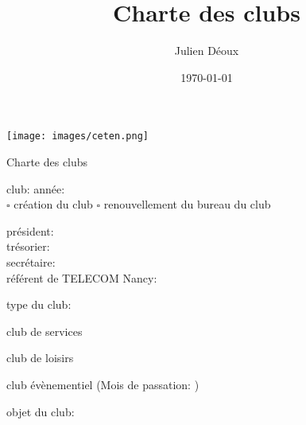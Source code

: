 \documentclass{article}
\title{Charte des clubs}
\author{Julien Déoux}
\date\today
\begin{document}
	
	\begin{titlepage}
		\begin{center}
			\texttt{[image: images/ceten.png]}\par
			\vspace{0.5cm}
			{\Huge \light{} Charte des clubs}\par
			\vspace{1cm}
		\end{center}
		\begin{center}
			club: \underline{\hspace{8cm}}
			année: \underline{\hspace{1.5cm}}\\
			\vspace{\baselineskip}
			$\square$ création du club
			\hspace{3cm}
			$\square$ renouvellement du bureau du club\\
			\vspace{\baselineskip}
			\begin{spacing}{1.5}
				président: \underline{\hspace{7cm}}\\
				trésorier: \underline{\hspace{7cm}}\\
				secrétaire: \underline{\hspace{7cm}}\\
				référent de TELECOM Nancy: \underline{\hspace{7cm}}\\
			\end{spacing}
		\end{center}
		type du club:
		\begin{todolist}
		\item club de services
		\item club de loisirs
		\item club évènementiel (Mois de passation:
			\underline{\hspace{5cm}})
		\end{todolist}
		\vspace{\baselineskip}
		objet du club:\\
		\hspace{\textwidth}\\
		\underline{\hspace{\textwidth}}\\
		\hspace{\textwidth}\\
		\underline{\hspace{\textwidth}}\\
		\hspace{\textwidth}\\
		\underline{\hspace{\textwidth}}\\


\end{titlepage}
\end{document}
